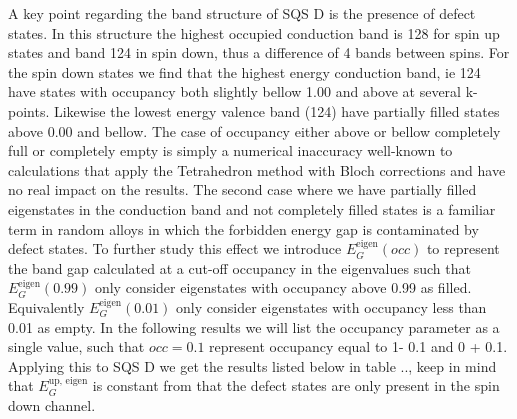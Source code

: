 A key point regarding the band structure of SQS D is the presence of defect states. In this structure the highest occupied conduction band is 128 for spin up states and band 124 in spin down, thus a difference of 4 bands between spins. For the spin down states we find that the highest energy conduction band, ie 124 have states with occupancy both slightly bellow 1.00 and above at several k-points. Likewise the lowest energy valence band (124) have partially filled states above 0.00 and bellow. The case of occupancy either above or bellow completely full or completely empty is simply a numerical inaccuracy well-known to calculations that apply the Tetrahedron method with Bloch corrections and have no real impact on the results. The second case where we have partially filled eigenstates in the conduction band and not completely filled states is a familiar term in random alloys \cite{PhysRevLett.104.236403} in which the forbidden energy gap is contaminated by defect states. To further study this effect we introduce $E_G ^\text{eigen}(occ)$ to represent the band gap calculated at a cut-off occupancy in the eigenvalues such that $E_G ^\text{eigen}(0.99)$ only consider eigenstates with occupancy above 0.99 as filled. Equivalently $E_G ^\text{eigen}(0.01)$ only consider eigenstates with occupancy less than 0.01 as empty. In the following results we will list the occupancy parameter as a single value, such that $occ = 0.1$ represent occupancy equal to 1- 0.1 and 0 + 0.1. Applying this to SQS D we get the results listed below in table .., keep in mind that $E_G ^\text{up, eigen}$ is constant from that the defect states are only present in the spin down channel.

